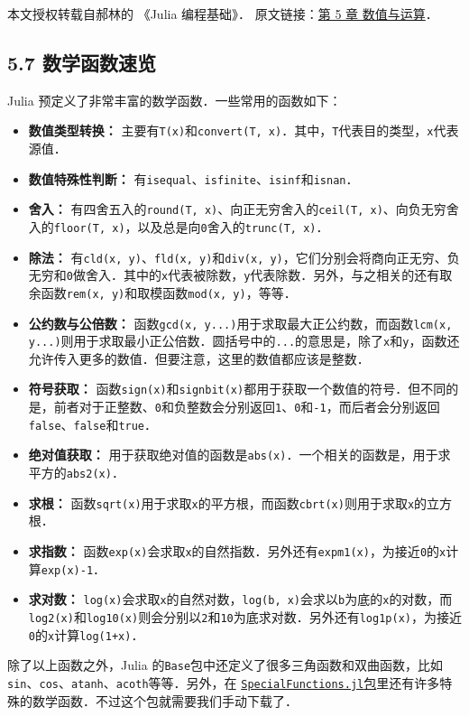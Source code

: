 
本文授权转载自郝林的 《Julia 编程基础》． 原文链接：\href{https://github.com/hyper0x/JuliaBasics/blob/master/book/ch05.md}{第 5 章 数值与运算}．


\subsection{5.7 数学函数速览}

Julia 预定义了非常丰富的数学函数．一些常用的函数如下：

\begin{itemize}
\item \textbf{数值类型转换：} 主要有\verb|T(x)|和\verb|convert(T, x)|．其中，\verb|T|代表目的类型，\verb|x|代表源值．
\item \textbf{数值特殊性判断：} 有\verb|isequal|、\verb|isfinite|、\verb|isinf|和\verb|isnan|．
\item \textbf{舍入：} 有四舍五入的\verb|round(T, x)|、向正无穷舍入的\verb|ceil(T, x)|、向负无穷舍入的\verb|floor(T, x)|，以及总是向\verb|0|舍入的\verb|trunc(T, x)|．
\item \textbf{除法：} 有\verb|cld(x, y)|、\verb|fld(x, y)|和\verb|div(x, y)|，它们分别会将商向正无穷、负无穷和\verb|0|做舍入．其中的\verb|x|代表被除数，\verb|y|代表除数．另外，与之相关的还有取余函数\verb|rem(x, y)|和取模函数\verb|mod(x, y)|，等等．
\item \textbf{公约数与公倍数：} 函数\verb|gcd(x, y...)|用于求取最大正公约数，而函数\verb|lcm(x, y...)|则用于求取最小正公倍数．圆括号中的\verb|...|的意思是，除了\verb|x|和\verb|y|，函数还允许传入更多的数值．但要注意，这里的数值都应该是整数．
\item \textbf{符号获取：} 函数\verb|sign(x)|和\verb|signbit(x)|都用于获取一个数值的符号．但不同的是，前者对于正整数、\verb|0|和负整数会分别返回\verb|1|、\verb|0|和\verb|-1|，而后者会分别返回\verb|false|、\verb|false|和\verb|true|．
\item \textbf{绝对值获取：} 用于获取绝对值的函数是\verb|abs(x)|．一个相关的函数是，用于求平方的\verb|abs2(x)|．
\item \textbf{求根：} 函数\verb|sqrt(x)|用于求取\verb|x|的平方根，而函数\verb|cbrt(x)|则用于求取\verb|x|的立方根．
\item \textbf{求指数：} 函数\verb|exp(x)|会求取\verb|x|的自然指数．另外还有\verb|expm1(x)|，为接近\verb|0|的\verb|x|计算\verb|exp(x)-1|．
\item \textbf{求对数：} \verb|log(x)|会求取\verb|x|的自然对数，\verb|log(b, x)|会求以\verb|b|为底的\verb|x|的对数，而\verb|log2(x)|和\verb|log10(x)|则会分别以\verb|2|和\verb|10|为底求对数．另外还有\verb|log1p(x)|，为接近\verb|0|的\verb|x|计算\verb|log(1+x)|．
\end{itemize}

除了以上函数之外，Julia 的\verb|Base|包中还定义了很多三角函数和双曲函数，比如\verb|sin|、\verb|cos|、\verb|atanh|、\verb|acoth|等等．另外，在 \href{https://github.com/JuliaMath/SpecialFunctions.jl}{\verb|SpecialFunctions.jl|包}里还有许多特殊的数学函数．不过这个包就需要我们手动下载了．